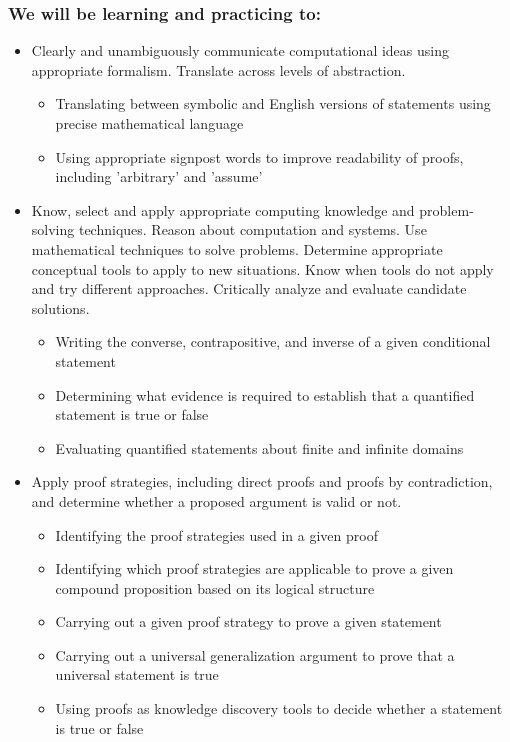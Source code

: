 \subsubsection*{We will be learning and practicing to:}
\begin{itemize}

\item Clearly and unambiguously communicate computational ideas using appropriate formalism. Translate across levels of abstraction.
\begin{itemize}
   \item Translating between symbolic and English versions of statements using precise mathematical language
    \item Using appropriate signpost words to improve readability of proofs, including 'arbitrary' and 'assume'
\end{itemize}

\item Know, select and apply appropriate computing knowledge and problem-solving techniques. Reason about computation and systems. Use mathematical techniques to solve problems. Determine appropriate conceptual tools to apply to new situations. Know when tools do not apply and try different approaches. Critically analyze and evaluate candidate solutions.
\begin{itemize}
    \item Writing the converse, contrapositive, and inverse of a given conditional statement
    \item Determining what evidence is required to establish that a quantified statement is true or false
    \item Evaluating quantified statements about finite and infinite domains
\end{itemize}

\item Apply proof strategies, including direct proofs and proofs by contradiction, and determine whether a proposed argument is valid or not.
\begin{itemize}
    \item Identifying the proof strategies used in a given proof
    \item Identifying which proof strategies are applicable to prove a given compound proposition based on its logical structure
    \item Carrying out a given proof strategy to prove a given statement
    \item Carrying out a universal generalization argument to prove that a universal statement is true
    \item Using proofs as knowledge discovery tools to decide whether a statement is true or false
\end{itemize}
\end{itemize}

